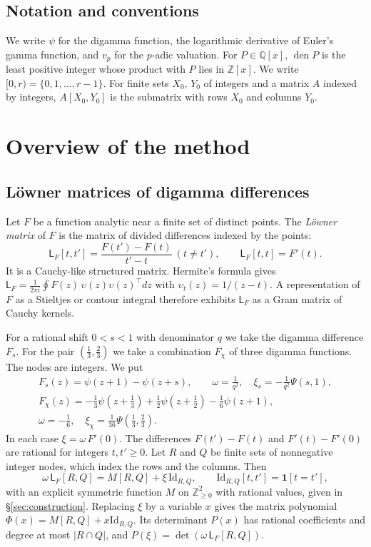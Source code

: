 \documentclass[11pt]{amsart}
\theoremstyle{definition}
\theoremstyle{remark}
\numberwithin{equation}{section}
\newcommand{\Z}{\mathbb Z}
\newcommand{\Q}{\mathbb Q}
\newcommand{\den}{\operatorname{den}}
\newcommand{\Lw}{\mathsf L}          %
\newcommand{\Id}{\mathrm{Id}}
\begin{document}
\subsection{Notation and conventions}
We write $\psi$ for the digamma function, the logarithmic derivative of Euler's gamma function, and $v_p$ for the
$p$-adic valuation. For $P\in\Q[x]$, $\den P$ is the least positive integer whose product with $P$ lies in $\Z[x]$. We
write $[0,r)=\{0,1,\dots,r-1\}$. For finite sets $X_0$, $Y_0$ of integers and a matrix $A$ indexed by integers,
$A[X_0,Y_0]$ is the submatrix with rows $X_0$ and columns $Y_0$.

\section{Overview of the method}\label{sec:overview}

\subsection{L\"owner matrices of digamma differences}
Let $F$ be a function analytic near a finite set of distinct points. The \emph{L\"owner matrix} \cite{Loewner34} of $F$
is the matrix of divided differences indexed by the points:
\[
 \Lw_F[t,t']=\frac{F(t')-F(t)}{t'-t}\ (t\ne t'),\qquad \Lw_F[t,t]=F'(t).
\]
It is a Cauchy-like structured matrix. Hermite's formula gives
$\Lw_F=\frac1{2\pi i}\oint F(z)\,\upsilon(z)\upsilon(z)^{\top}dz$ with $\upsilon_t(z)=1/(z-t)$. A representation of $F$ as
a Stieltjes or contour integral therefore exhibits $\Lw_F$ as a Gram matrix of Cauchy kernels.

For a rational shift $0<s<1$ with denominator $q$ we take the digamma difference $F_s$. For the pair
$(\frac13,\frac23)$ we take a combination $F_\chi$ of three digamma functions. The nodes are integers. We put
\begin{equation}\label{eq:frames}
\begin{gathered}
 F_s(z)=\psi(z+1)-\psi(z+s),\qquad \omega=\tfrac1{q^2},\quad \xi_s=-\tfrac1{q^2}\Psi(s,1),\\
 F_{\chi}(z)=-\tfrac13\psi(z+\tfrac13)+\tfrac12\psi(z+\tfrac12)-\tfrac16\psi(z+1),\\
 \omega=-\tfrac16,\quad \xi_\chi=\tfrac1{36}\Psi(\tfrac13,\tfrac23).
\end{gathered}
\end{equation}
In each case $\xi=\omega\,F'(0)$. The differences $F(t')-F(t)$ and $F'(t)-F'(0)$ are rational for integers $t,t'\ge0$.
Let $R$ and $Q$ be finite sets of nonnegative integer nodes, which index the rows and the columns. Then
\begin{equation}\label{eq:shift}
 \omega\,\Lw_F[R,Q]=M[R,Q]+\xi\,\Id_{R,Q},\qquad \Id_{R,Q}[t,t']=\mathbf 1[t=t'],
\end{equation}
with an explicit symmetric function $M$ on $\Z_{\ge0}^2$ with rational values, given in \S\ref{sec:construction}.
Replacing $\xi$ by a variable $x$ gives the matrix polynomial $\Phi(x)=M[R,Q]+x\Id_{R,Q}$. Its determinant $P(x)$ has
rational coefficients and degree at most $|R\cap Q|$, and $P(\xi)=\det(\omega\,\Lw_F[R,Q])$.
\end{document}
